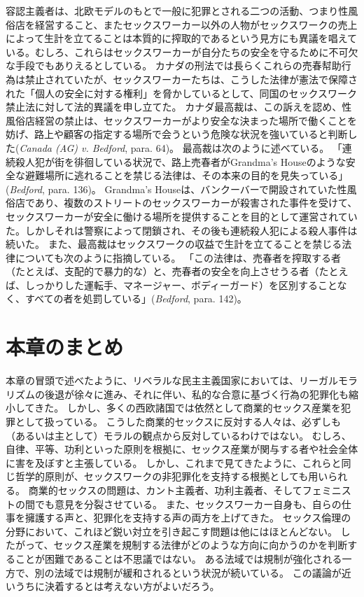 \documentclass[paper=a4,book,openany]{jlreq}
\begin{document}
容認主義者は、北欧モデルのもとで一般に犯罪とされる二つの活動、つまり性風俗店を経営すること、またセックスワーカー以外の人物がセックスワークの売上によって生計を立てることは本質的に搾取的であるという見方にも異議を唱えている。むしろ、これらはセックスワーカーが自分たちの安全を守るために不可欠な手段でもありえるとしている。
カナダの刑法では長らくこれらの売春幇助行為は禁止されていたが、セックスワーカーたちは、こうした法律が憲法で保障された「個人の安全に対する権利」を脅かしているとして、同国のセックスワーク禁止法に対して法的異議を申し立てた。
カナダ最高裁は、この訴えを認め、性風俗店経営の禁止は、セックスワーカーがより安全な決まった場所で働くことを妨げ、路上や顧客の指定する場所で会うという危険な状況を強いていると判断した(\emph{Canada (AG) v. Bedford}, para. 64)。
最高裁は次のように述べている。
「連続殺人犯が街を徘徊している状況で、路上売春者がGrandma's Houseのような安全な避難場所に逃れることを禁じる法律は、その本来の目的を見失っている」(\emph{Bedford}, para. 136)。
Grandma's Houseは、バンクーバーで開設されていた性風俗店であり、複数のストリートのセックスワーカーが殺害された事件を受けて、セックスワーカーが安全に働ける場所を提供することを目的として運営されていた。しかしそれは警察によって閉鎖され、その後も連続殺人犯による殺人事件は続いた。
また、最高裁はセックスワークの収益で生計を立てることを禁じる法律についても次のように指摘している。
「この法律は、売春者を搾取する者（たとえば、支配的で暴力的な）と、売春者の安全を向上させうる者（たとえば、しっかりした運転手、マネージャー、ボディーガード）を区別することなく、すべての者を処罰している」(\emph{Bedford}, para. 142)。
\section{本章のまとめ}

本章の冒頭で述べたように、リベラルな民主主義国家においては、リーガルモラリズムの後退が徐々に進み、それに伴い、私的な合意に基づく行為の犯罪化も縮小してきた。
しかし、多くの西欧諸国では依然として商業的セックス産業を犯罪として扱っている。
こうした商業的セックスに反対する人々は、必ずしも（あるいは主として）モラルの観点から反対しているわけではない。
むしろ、自律、平等、功利といった原則を根拠に、セックス産業が関与する者や社会全体に害を及ぼすと主張している。
しかし、これまで見てきたように、これらと同じ哲学的原則が、セックスワークの非犯罪化を支持する根拠としても用いられる。
商業的セックスの問題は、カント主義者、功利主義者、そしてフェミニストの間でも意見を分裂させている。
また、セックスワーカー自身も、自らの仕事を擁護する声と、犯罪化を支持する声の両方を上げてきた。
セックス倫理の分野において、これほど鋭い対立を引き起こす問題は他にはほとんどない。
したがって、セックス産業を規制する法律がどのような方向に向かうのかを判断することが困難であることは不思議ではない。
ある法域では規制が強化される一方で、別の法域では規制が緩和されるという状況が続いている。
この議論が近いうちに決着するとは考えない方がよいだろう。
\end{document}
